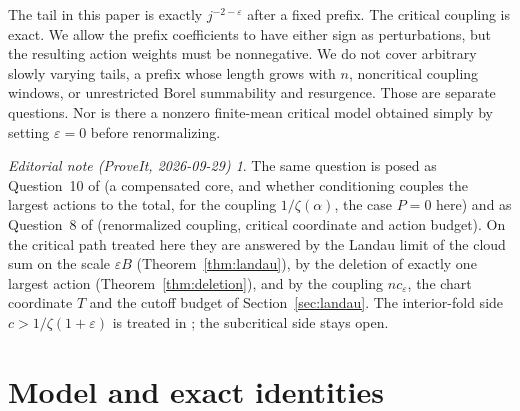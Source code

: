 \documentclass[11pt,a4paper]{article}
\theoremstyle{definition}\newtheorem{definition}[theorem]{Definition}
\theoremstyle{remark}\newtheorem{remark}[theorem]{Remark}
\newtheorem*{ednote}{Editorial note (ProveIt, 2026-09-29)}
\newcommand{\eps}{\varepsilon}
\newcommand{\1}{\mathbf 1}
\begin{document}
The tail in this paper is exactly $j^{-2-\eps}$ after a fixed prefix.
The critical coupling is exact. We allow the prefix coefficients to have
either sign as perturbations, but the resulting action weights must be
nonnegative. We do not cover arbitrary slowly varying tails, a prefix
whose length grows with $n$, noncritical coupling windows, or unrestricted
Borel summability and resurgence. Those are separate questions. Nor is
there a nonzero finite-mean critical model obtained simply by setting
$\eps=0$ before renormalizing.
\begin{ednote}
The same question is posed as Question~10 of
 (a compensated
core, and whether conditioning couples the largest actions to the total,
for the coupling $1/\zeta(\alpha)$, the case $P=0$ here) and as
Question~8 of 
(renormalized coupling, critical coordinate and action budget). On the
critical path treated here they are answered by the Landau limit of the
cloud sum on the scale $\eps B$ (Theorem~\ref{thm:landau}), by the deletion of
exactly one largest action (Theorem~\ref{thm:deletion}), and by the
coupling $nc_\eps$, the chart coordinate $T$ and the cutoff budget of
Section~\ref{sec:landau}. The interior-fold side $c>1/\zeta(1+\eps)$ is
treated in ; the
subcritical side stays open.
\end{ednote}

\section{Model and exact identities}
\label{sec:model}
\end{document}
